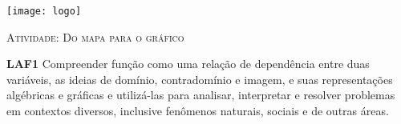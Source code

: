 \documentclass[10 pt,usenames,dvipsnames, oneside]{article}
\begin{document}
\begin{center}
  \begin{minipage}[l]{3cm}
\texttt{[image: logo]}    
\end{minipage}\hfill
\begin{minipage}[r]{.8\textwidth}
 {\Large \scshape Atividade: Do mapa para o gráfico }  
\end{minipage}
\end{center}
\vspace{.2cm}

\ifdefined\prof
\begin{objetivos}
\item \textbf{LAF1} Compreender função como uma relação de dependência entre duas variáveis, as ideias de domínio, contradomínio e imagem, e suas representações algébricas e gráficas e utilizá-las para analisar, interpretar e resolver problemas em contextos diversos, inclusive fenômenos naturais, sociais e de outras áreas.
\end{objetivos}
\end{document}
